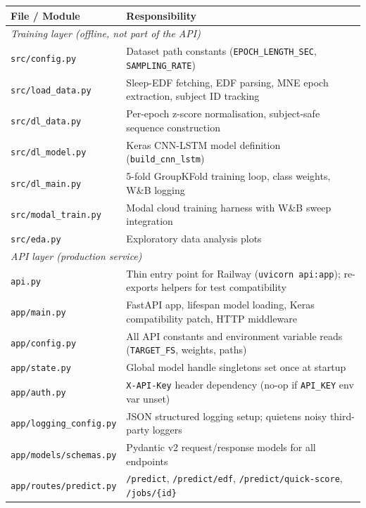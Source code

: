 \documentclass[10pt]{article}
\begin{document}
\begin{table}[h]
\centering
\small
\renewcommand{\arraystretch}{1.2}
\begin{tabular}{|l|p{8.5cm}|}
\hline
\textbf{File / Module} & \textbf{Responsibility} \\\hline
\multicolumn{2}{|l|}{\textit{Training layer (offline, not part of the API)}} \\\hline
\texttt{src/config.py} & Dataset path constants (\texttt{EPOCH\_LENGTH\_SEC}, \texttt{SAMPLING\_RATE}) \\\hline
\texttt{src/load\_data.py} & Sleep-EDF fetching, EDF parsing, MNE epoch extraction, subject ID tracking \\\hline
\texttt{src/dl\_data.py} & Per-epoch z-score normalisation, subject-safe sequence construction \\\hline
\texttt{src/dl\_model.py} & Keras CNN-LSTM model definition (\texttt{build\_cnn\_lstm}) \\\hline
\texttt{src/dl\_main.py} & 5-fold GroupKFold training loop, class weights, W\&B logging \\\hline
\texttt{src/modal\_train.py} & Modal cloud training harness with W\&B sweep integration \\\hline
\texttt{src/eda.py} & Exploratory data analysis plots \\\hline
\multicolumn{2}{|l|}{\textit{API layer (production service)}} \\\hline
\texttt{api.py} & Thin entry point for Railway (\texttt{uvicorn api:app}); re-exports helpers for test compatibility \\\hline
\texttt{app/main.py} & FastAPI app, lifespan model loading, Keras compatibility patch, HTTP middleware \\\hline
\texttt{app/config.py} & All API constants and environment variable reads (\texttt{TARGET\_FS}, weights, paths) \\\hline
\texttt{app/state.py} & Global model handle singletons set once at startup \\\hline
\texttt{app/auth.py} & \texttt{X-API-Key} header dependency (no-op if \texttt{API\_KEY} env var unset) \\\hline
\texttt{app/logging\_config.py} & JSON structured logging setup; quietens noisy third-party loggers \\\hline
\texttt{app/models/schemas.py} & Pydantic v2 request/response models for all endpoints \\\hline
\texttt{app/routes/predict.py} & \texttt{/predict}, \texttt{/predict/edf}, \texttt{/predict/quick-score}, \texttt{/jobs/\{id\}} \\\hline

\end{tabular}
\end{table}
\end{document}
